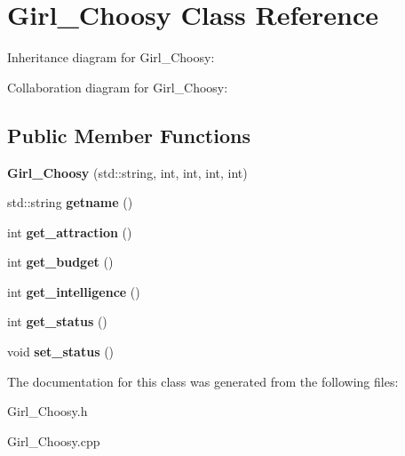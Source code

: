 \hypertarget{classGirl__Choosy}{}\section{Girl\+\_\+\+Choosy Class Reference}
\label{classGirl__Choosy}


Inheritance diagram for Girl\+\_\+\+Choosy\+:


Collaboration diagram for Girl\+\_\+\+Choosy\+:
\subsection*{Public Member Functions}
\begin{DoxyCompactItemize}
\item 
{\bfseries Girl\+\_\+\+Choosy} (std\+::string, int, int, int, int)\hypertarget{classGirl__Choosy_aa10bee77dffad4215aedb6a54e197fdc}{}\label{classGirl__Choosy_aa10bee77dffad4215aedb6a54e197fdc}

\item 
std\+::string {\bfseries getname} ()\hypertarget{classGirl__Choosy_a8ff935f9281ccbda7127d0440088a264}{}\label{classGirl__Choosy_a8ff935f9281ccbda7127d0440088a264}

\item 
int {\bfseries get\+\_\+attraction} ()\hypertarget{classGirl__Choosy_ae9027da9c64cfb71e902f4914a83d7c3}{}\label{classGirl__Choosy_ae9027da9c64cfb71e902f4914a83d7c3}

\item 
int {\bfseries get\+\_\+budget} ()\hypertarget{classGirl__Choosy_aee59bba381f5fa53a3b30677a34ca605}{}\label{classGirl__Choosy_aee59bba381f5fa53a3b30677a34ca605}

\item 
int {\bfseries get\+\_\+intelligence} ()\hypertarget{classGirl__Choosy_a068ca96162b38d78c3a72430b0e1e1c0}{}\label{classGirl__Choosy_a068ca96162b38d78c3a72430b0e1e1c0}

\item 
int {\bfseries get\+\_\+status} ()\hypertarget{classGirl__Choosy_a52a80c6cd4115e63689364a1e7046721}{}\label{classGirl__Choosy_a52a80c6cd4115e63689364a1e7046721}

\item 
void {\bfseries set\+\_\+status} ()\hypertarget{classGirl__Choosy_a9e9301518bb2ad1accef699e0560d508}{}\label{classGirl__Choosy_a9e9301518bb2ad1accef699e0560d508}

\end{DoxyCompactItemize}


The documentation for this class was generated from the following files\+:\begin{DoxyCompactItemize}
\item 
Girl\+\_\+\+Choosy.\+h\item 
Girl\+\_\+\+Choosy.\+cpp\end{DoxyCompactItemize}
